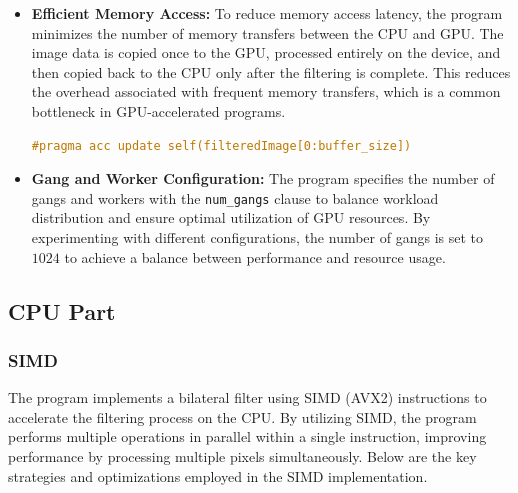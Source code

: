 \documentclass[12pt,a4paper]{report}
\begin{document}
\begin{itemize}
\item \textbf{Efficient Memory Access:} To reduce memory access latency, the program minimizes the number of memory transfers between the CPU and GPU. The image data is copied once to the GPU, processed entirely on the device, and then copied back to the CPU only after the filtering is complete. This reduces the overhead associated with frequent memory transfers, which is a common bottleneck in GPU-accelerated programs.
\begin{lstlisting}[language=c++]
#pragma acc update self(filteredImage[0:buffer_size])
\end{lstlisting}

\item \textbf{Gang and Worker Configuration:} The program specifies the number of gangs and workers with the \texttt{num\_gangs} clause to balance workload distribution and ensure optimal utilization of GPU resources. By experimenting with different configurations, the number of gangs is set to $1024$ to achieve a balance between performance and resource usage.
\end{itemize}


\subsection{CPU Part}

\subsubsection*{SIMD}
The program implements a bilateral filter using SIMD (AVX2) instructions to accelerate the filtering process on the CPU. By utilizing SIMD, the program performs multiple operations in parallel within a single instruction, improving performance by processing multiple pixels simultaneously. Below are the key strategies and optimizations employed in the SIMD implementation.
\end{document}

